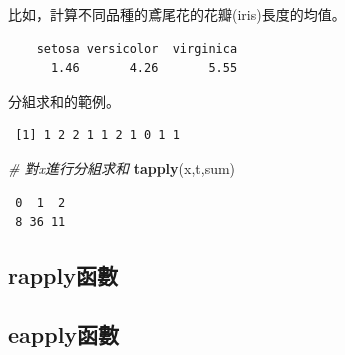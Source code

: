 \documentclass[]{book}
\newenvironment{Shaded}{\begin{snugshade}}{\end{snugshade}}
\newcommand{\CommentTok}[1]{\textcolor[rgb]{0.56,0.35,0.01}{\textit{#1}}}
\newcommand{\DecValTok}[1]{\textcolor[rgb]{0.00,0.00,0.81}{#1}}
\newcommand{\KeywordTok}[1]{\textcolor[rgb]{0.13,0.29,0.53}{\textbf{#1}}}
\newcommand{\NormalTok}[1]{#1}
\newcommand{\OperatorTok}[1]{\textcolor[rgb]{0.81,0.36,0.00}{\textbf{#1}}}
\theoremstyle{definition}
\theoremstyle{definition}
\theoremstyle{definition}
\theoremstyle{remark}
\begin{document}
比如，計算不同品種的鳶尾花的花瓣(iris)長度的均值。

\begin{Shaded}
\end{Shaded}

\begin{verbatim}
    setosa versicolor  virginica 
      1.46       4.26       5.55 
\end{verbatim}

分組求和的範例。

\begin{Shaded}
\end{Shaded}

\begin{verbatim}
 [1] 1 2 2 1 1 2 1 0 1 1
\end{verbatim}

\begin{Shaded}
\begin{Highlighting}[]
\CommentTok{# 對x進行分組求和}
\KeywordTok{tapply}\NormalTok{(x,t,sum)}
\end{Highlighting}
\end{Shaded}

\begin{verbatim}
 0  1  2 
 8 36 11 
\end{verbatim}

\hypertarget{rapply}{%
\subsection{rapply函數}\label{rapply}}

\hypertarget{eapply}{%
\subsection{eapply函數}\label{eapply}}
\end{document}
